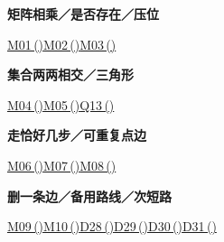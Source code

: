 \documentclass[10pt,a4paper]{article}
\newcommand{\grouphead}[1]{\needspace{7\baselineskip}\par\vspace{7pt}{\large\bfseries #1}\par\vspace{5pt}}
\begin{document}
\grouphead{矩阵、图与路径}
\begin{minipage}{\linewidth}\textbf{矩阵相乘／是否存在／压位}\par{\fontsize{9.5}{12}\selectfont \hyperref[M01]{M01\,(\pageref*{M01})}\hspace{.5em}\allowbreak \hyperref[M02]{M02\,(\pageref*{M02})}\hspace{.5em}\allowbreak \hyperref[M03]{M03\,(\pageref*{M03})}}\end{minipage}\par\vspace{5pt}
\begin{minipage}{\linewidth}\textbf{集合两两相交／三角形}\par{\fontsize{9.5}{12}\selectfont \hyperref[M04]{M04\,(\pageref*{M04})}\hspace{.5em}\allowbreak \hyperref[M05]{M05\,(\pageref*{M05})}\hspace{.5em}\allowbreak \hyperref[Q13]{Q13\,(\pageref*{Q13})}}\end{minipage}\par\vspace{5pt}
\begin{minipage}{\linewidth}\textbf{走恰好几步／可重复点边}\par{\fontsize{9.5}{12}\selectfont \hyperref[M06]{M06\,(\pageref*{M06})}\hspace{.5em}\allowbreak \hyperref[M07]{M07\,(\pageref*{M07})}\hspace{.5em}\allowbreak \hyperref[M08]{M08\,(\pageref*{M08})}}\end{minipage}\par\vspace{5pt}
\begin{minipage}{\linewidth}\textbf{删一条边／备用路线／次短路}\par{\fontsize{9.5}{12}\selectfont \hyperref[M09]{M09\,(\pageref*{M09})}\hspace{.5em}\allowbreak \hyperref[M10]{M10\,(\pageref*{M10})}\hspace{.5em}\allowbreak \hyperref[D28]{D28\,(\pageref*{D28})}\hspace{.5em}\allowbreak \hyperref[D29]{D29\,(\pageref*{D29})}\hspace{.5em}\allowbreak \hyperref[D30]{D30\,(\pageref*{D30})}\hspace{.5em}\allowbreak \hyperref[D31]{D31\,(\pageref*{D31})}}\end{minipage}\par\vspace{5pt}
\end{document}
